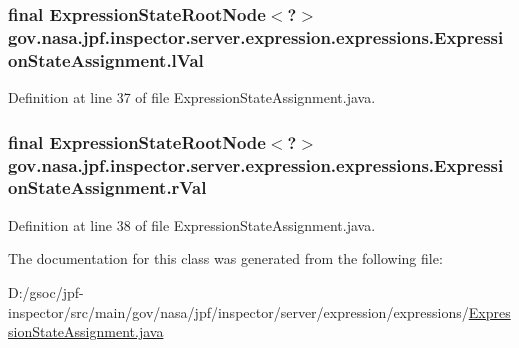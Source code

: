 \subsubsection[{\texorpdfstring{l\+Val}{lVal}}]{\setlength{\rightskip}{0pt plus 5cm}final {\bf Expression\+State\+Root\+Node}$<$?$>$ gov.\+nasa.\+jpf.\+inspector.\+server.\+expression.\+expressions.\+Expression\+State\+Assignment.\+l\+Val\hspace{0.3cm}{\ttfamily [private]}}\hypertarget{classgov_1_1nasa_1_1jpf_1_1inspector_1_1server_1_1expression_1_1expressions_1_1_expression_state_assignment_ad6de82c2ceb7cfde3eda4788fc0068a4}{}\label{classgov_1_1nasa_1_1jpf_1_1inspector_1_1server_1_1expression_1_1expressions_1_1_expression_state_assignment_ad6de82c2ceb7cfde3eda4788fc0068a4}


Definition at line 37 of file Expression\+State\+Assignment.\+java.

\subsubsection[{\texorpdfstring{r\+Val}{rVal}}]{\setlength{\rightskip}{0pt plus 5cm}final {\bf Expression\+State\+Root\+Node}$<$?$>$ gov.\+nasa.\+jpf.\+inspector.\+server.\+expression.\+expressions.\+Expression\+State\+Assignment.\+r\+Val\hspace{0.3cm}{\ttfamily [private]}}\hypertarget{classgov_1_1nasa_1_1jpf_1_1inspector_1_1server_1_1expression_1_1expressions_1_1_expression_state_assignment_ac9be8f4277f7f3747a3a6a2de5895d73}{}\label{classgov_1_1nasa_1_1jpf_1_1inspector_1_1server_1_1expression_1_1expressions_1_1_expression_state_assignment_ac9be8f4277f7f3747a3a6a2de5895d73}


Definition at line 38 of file Expression\+State\+Assignment.\+java.



The documentation for this class was generated from the following file\+:\begin{DoxyCompactItemize}
\item 
D\+:/gsoc/jpf-\/inspector/src/main/gov/nasa/jpf/inspector/server/expression/expressions/\hyperlink{_expression_state_assignment_8java}{Expression\+State\+Assignment.\+java}\end{DoxyCompactItemize}
